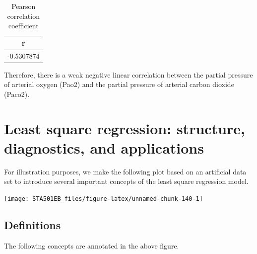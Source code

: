\documentclass[
]{book}
\begin{document}
\begin{table}

\caption{\label{tab:unnamed-chunk-139}Pearson correlation coefficient}
\centering
\begin{tabular}[t]{c}
\hline
r\\
\hline
-0.5307874\\
\hline
\end{tabular}
\end{table}

Therefore, there is a weak negative linear correlation between the partial pressure of arterial oxygen (Pao2) and the partial pressure of arterial carbon dioxide (Paco2).

\hypertarget{least-square-regression-structure-diagnostics-and-applications}{%
\section{Least square regression: structure, diagnostics, and applications}\label{least-square-regression-structure-diagnostics-and-applications}}

For illustration purposes, we make the following plot based on an artificial data set to introduce several important concepts of the least square regression model.

\begin{center}\texttt{[image: STA501EB\_files/figure-latex/unnamed-chunk-140-1]} \end{center}

\hypertarget{definitions}{%
\subsection{Definitions}\label{definitions}}

The following concepts are annotated in the above figure.
\end{document}
